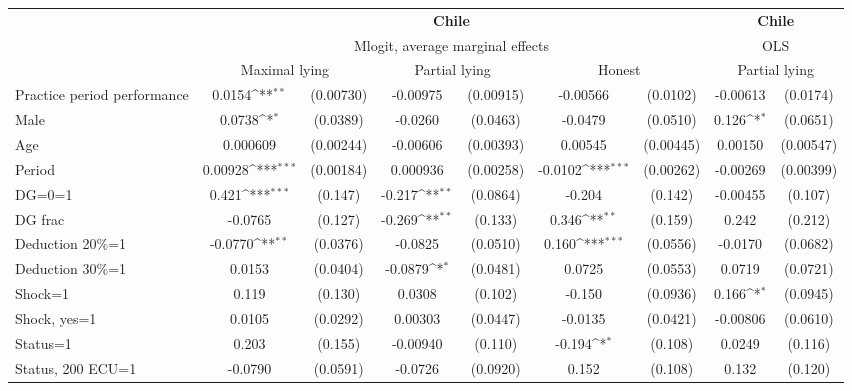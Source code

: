 \def\sym#1{\ifmmode^{#1}\else\(^{#1}\)\fi}
\begin{tabular}{l|cccccc|cc}
\hline\hline
&\multicolumn{6}{c|}{\bf Chile}&\multicolumn{2}{c}{\bf Chile}\\ &\multicolumn{6}{c|}{Mlogit, average marginal effects }&\multicolumn{2}{c}{OLS}\\
                &\multicolumn{2}{c}{Maximal lying}&\multicolumn{2}{c}{Partial lying}&\multicolumn{2}{c|}{Honest}  &\multicolumn{2}{c}{Partial lying}\\
\hline
Practice period performance&   0.0154\sym{**} &(0.00730)& -0.00975         &(0.00915)& -0.00566         & (0.0102)& -0.00613         & (0.0174)\\
Male            &   0.0738\sym{*}  & (0.0389)&  -0.0260         & (0.0463)&  -0.0479         & (0.0510)&    0.126\sym{*}  & (0.0651)\\
Age             & 0.000609         &(0.00244)& -0.00606         &(0.00393)&  0.00545         &(0.00445)&  0.00150         &(0.00547)\\
Period          &  0.00928\sym{***}&(0.00184)& 0.000936         &(0.00258)&  -0.0102\sym{***}&(0.00262)& -0.00269         &(0.00399)\\
DG=0=1          &    0.421\sym{***}&  (0.147)&   -0.217\sym{**} & (0.0864)&   -0.204         &  (0.142)& -0.00455         &  (0.107)\\
DG frac         &  -0.0765         &  (0.127)&   -0.269\sym{**} &  (0.133)&    0.346\sym{**} &  (0.159)&    0.242         &  (0.212)\\
Deduction 20\%=1&  -0.0770\sym{**} & (0.0376)&  -0.0825         & (0.0510)&    0.160\sym{***}& (0.0556)&  -0.0170         & (0.0682)\\
Deduction 30\%=1&   0.0153         & (0.0404)&  -0.0879\sym{*}  & (0.0481)&   0.0725         & (0.0553)&   0.0719         & (0.0721)\\
Shock=1         &    0.119         &  (0.130)&   0.0308         &  (0.102)&   -0.150         & (0.0936)&    0.166\sym{*}  & (0.0945)\\
Shock, yes=1    &   0.0105         & (0.0292)&  0.00303         & (0.0447)&  -0.0135         & (0.0421)& -0.00806         & (0.0610)\\
Status=1        &    0.203         &  (0.155)& -0.00940         &  (0.110)&   -0.194\sym{*}  &  (0.108)&   0.0249         &  (0.116)\\
Status, 200 ECU=1&  -0.0790         & (0.0591)&  -0.0726         & (0.0920)&    0.152         &  (0.108)&    0.132         &  (0.120)\\

\end{tabular}
